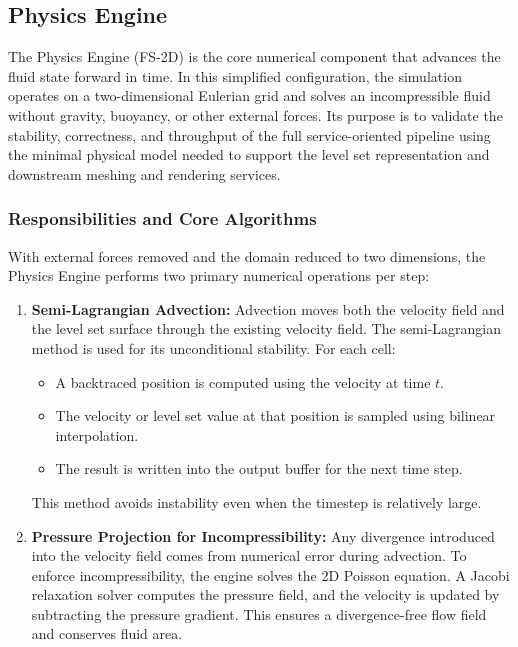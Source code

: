 \documentclass[12pt,a4paper]{article}
\begin{document}
\subsection{Physics Engine}

The Physics Engine (FS-2D) is the core numerical component that advances the fluid state forward in time. In this simplified configuration, the simulation operates on a two-dimensional Eulerian grid and solves an incompressible fluid without gravity, buoyancy, or other external forces. Its purpose is to validate the stability, correctness, and throughput of the full service-oriented pipeline using the minimal physical model needed to support the level set representation and downstream meshing and rendering services.

\subsubsection{Responsibilities and Core Algorithms}

With external forces removed and the domain reduced to two dimensions, the Physics Engine performs two primary numerical operations per step:

\begin{enumerate}
    \item \textbf{Semi-Lagrangian Advection:} Advection moves both the velocity field and the level set surface through the existing velocity field. The semi-Lagrangian method is used for its unconditional stability. For each cell:
    \begin{itemize}
        \item A backtraced position is computed using the velocity at time $t$.
        \item The velocity or level set value at that position is sampled using bilinear interpolation.
        \item The result is written into the output buffer for the next time step.
    \end{itemize}
    This method avoids instability even when the timestep is relatively large.
    
    \item \textbf{Pressure Projection for Incompressibility:} Any divergence introduced into the velocity field comes from numerical error during advection. To enforce incompressibility, the engine solves the 2D Poisson equation. A Jacobi relaxation solver computes the pressure field, and the velocity is updated by subtracting the pressure gradient. This ensures a divergence-free flow field and conserves fluid area.
\end{enumerate}
\end{document}
